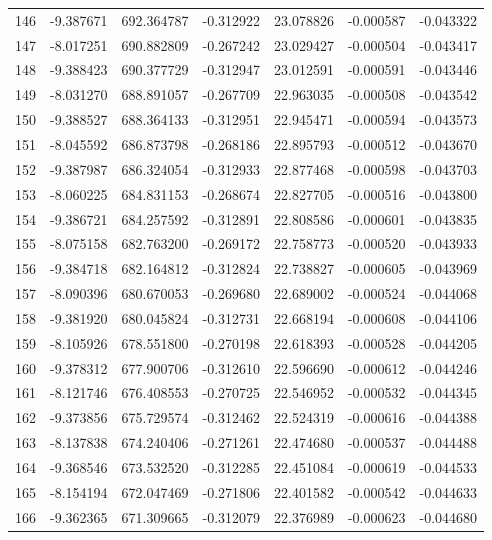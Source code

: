 \begin{tabular}{rrrrrrr}
 146 &  -9.387671 &  692.364787 & -0.312922 &   23.078826 &   -0.000587 & -0.043322 \\
 147 &  -8.017251 &  690.882809 & -0.267242 &   23.029427 &   -0.000504 & -0.043417 \\
 148 &  -9.388423 &  690.377729 & -0.312947 &   23.012591 &   -0.000591 & -0.043446 \\
 149 &  -8.031270 &  688.891057 & -0.267709 &   22.963035 &   -0.000508 & -0.043542 \\
 150 &  -9.388527 &  688.364133 & -0.312951 &   22.945471 &   -0.000594 & -0.043573 \\
 151 &  -8.045592 &  686.873798 & -0.268186 &   22.895793 &   -0.000512 & -0.043670 \\
 152 &  -9.387987 &  686.324054 & -0.312933 &   22.877468 &   -0.000598 & -0.043703 \\
 153 &  -8.060225 &  684.831153 & -0.268674 &   22.827705 &   -0.000516 & -0.043800 \\
 154 &  -9.386721 &  684.257592 & -0.312891 &   22.808586 &   -0.000601 & -0.043835 \\
 155 &  -8.075158 &  682.763200 & -0.269172 &   22.758773 &   -0.000520 & -0.043933 \\
 156 &  -9.384718 &  682.164812 & -0.312824 &   22.738827 &   -0.000605 & -0.043969 \\
 157 &  -8.090396 &  680.670053 & -0.269680 &   22.689002 &   -0.000524 & -0.044068 \\
 158 &  -9.381920 &  680.045824 & -0.312731 &   22.668194 &   -0.000608 & -0.044106 \\
 159 &  -8.105926 &  678.551800 & -0.270198 &   22.618393 &   -0.000528 & -0.044205 \\
 160 &  -9.378312 &  677.900706 & -0.312610 &   22.596690 &   -0.000612 & -0.044246 \\
 161 &  -8.121746 &  676.408553 & -0.270725 &   22.546952 &   -0.000532 & -0.044345 \\
 162 &  -9.373856 &  675.729574 & -0.312462 &   22.524319 &   -0.000616 & -0.044388 \\
 163 &  -8.137838 &  674.240406 & -0.271261 &   22.474680 &   -0.000537 & -0.044488 \\
 164 &  -9.368546 &  673.532520 & -0.312285 &   22.451084 &   -0.000619 & -0.044533 \\
 165 &  -8.154194 &  672.047469 & -0.271806 &   22.401582 &   -0.000542 & -0.044633 \\
 166 &  -9.362365 &  671.309665 & -0.312079 &   22.376989 &   -0.000623 & -0.044680 \\

\end{tabular}
